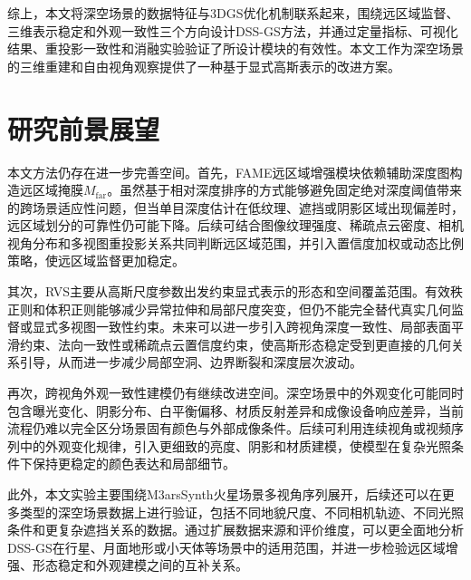 综上，本文将深空场景的数据特征与3DGS优化机制联系起来，围绕远区域监督、三维表示稳定和外观一致性三个方向设计DSS-GS方法，并通过定量指标、可视化结果、重投影一致性和消融实验验证了所设计模块的有效性。本文工作为深空场景的三维重建和自由视角观察提供了一种基于显式高斯表示的改进方案。

\section{研究前景展望}

本文方法仍存在进一步完善空间。首先，FAME远区域增强模块依赖辅助深度图构造远区域掩膜$M_{\mathrm{far}}$。虽然基于相对深度排序的方式能够避免固定绝对深度阈值带来的跨场景适应性问题，但当单目深度估计在低纹理、遮挡或阴影区域出现偏差时，远区域划分的可靠性仍可能下降。后续可结合图像纹理强度、稀疏点云密度、相机视角分布和多视图重投影关系共同判断远区域范围，并引入置信度加权或动态比例策略，使远区域监督更加稳定。

其次，RVS主要从高斯尺度参数出发约束显式表示的形态和空间覆盖范围。有效秩正则和体积正则能够减少异常拉伸和局部尺度突变，但仍不能完全替代真实几何监督或显式多视图一致性约束。未来可以进一步引入跨视角深度一致性、局部表面平滑约束、法向一致性或稀疏点云置信度约束，使高斯形态稳定受到更直接的几何关系引导，从而进一步减少局部空洞、边界断裂和深度层次波动。

再次，跨视角外观一致性建模仍有继续改进空间。深空场景中的外观变化可能同时包含曝光变化、阴影分布、白平衡偏移、材质反射差异和成像设备响应差异，当前流程仍难以完全区分场景固有颜色与外部成像条件。后续可利用连续视角或视频序列中的外观变化规律，引入更细致的亮度、阴影和材质建模，使模型在复杂光照条件下保持更稳定的颜色表达和局部细节。

此外，本文实验主要围绕M3arsSynth火星场景多视角序列展开，后续还可以在更多类型的深空场景数据上进行验证，包括不同地貌尺度、不同相机轨迹、不同光照条件和更复杂遮挡关系的数据。通过扩展数据来源和评价维度，可以更全面地分析DSS-GS在行星、月面地形或小天体等场景中的适用范围，并进一步检验远区域增强、形态稳定和外观建模之间的互补关系。
